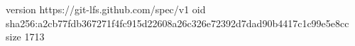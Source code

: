 version https://git-lfs.github.com/spec/v1
oid sha256:a2cb77fdb367271f4fc915d22608a26c326e72392d7dad90b4417c1c99e5e8cc
size 1713
